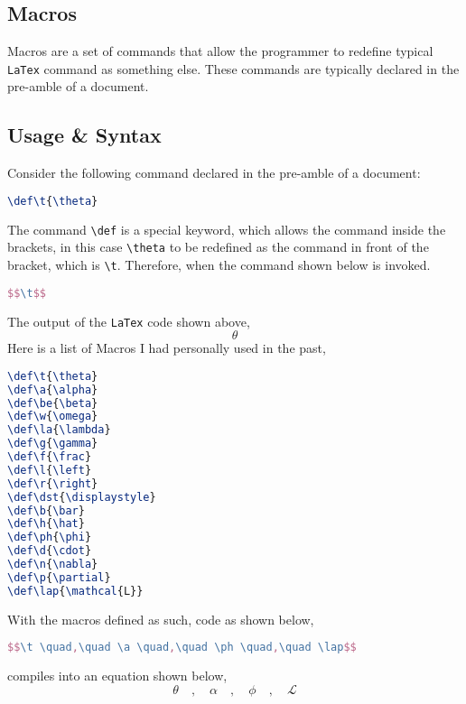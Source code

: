 \documentclass[a4paper, 12pt]{report}
\def\t{\theta}
\def\a{\alpha}
\def\be{\beta}
\def\w{\omega}
\def\la{\lambda}
\def\g{\gamma}
\def\f{\frac}
\def\l{\left}
\def\r{\right}
\def\dst{\displaystyle}
\def\b{\bar}
\def\h{\hat}
\def\ph{\phi}
\def\d{\cdot}
\def\n{\nabla}
\def\p{\partial}
\def\lap{\mathcal{L}}
\begin{document}
\begin{center}
\section{Macros}
\begin{comment}
Macros are evil
\end{comment}
Macros are a set of commands that allow the programmer to redefine typical \texttt{LaTex} command as something else. These commands are typically declared in the pre-amble of a document. 

\subsection{Usage \& Syntax}
\begin{comment}
\end{comment}
Consider the following command declared in the pre-amble of a document:
\begin{lstlisting}[language=tex]
\def\t{\theta}
\end{lstlisting}
The command \texttt{\textbackslash def} is a special keyword, which allows the command inside the brackets, in this case \texttt{\textbackslash theta} to be redefined as the command in front of the bracket, which is \texttt{\textbackslash t}. Therefore, when the command shown below is invoked.
\begin{lstlisting}[language=tex]
$$\t$$
\end{lstlisting}
The output of the \texttt{LaTex} code shown above,
$$\t$$
Here is a list of Macros I had personally used in the past,
\begin{lstlisting}[language=tex]
\def\t{\theta}
\def\a{\alpha}
\def\be{\beta}
\def\w{\omega}
\def\la{\lambda}
\def\g{\gamma}
\def\f{\frac}
\def\l{\left}
\def\r{\right}
\def\dst{\displaystyle}
\def\b{\bar}
\def\h{\hat}
\def\ph{\phi}
\def\d{\cdot}
\def\n{\nabla}
\def\p{\partial}
\def\lap{\mathcal{L}}
\end{lstlisting}
With the macros defined as such, code as shown below,
\begin{lstlisting}[language=tex]
$$\t \quad,\quad \a \quad,\quad \ph \quad,\quad \lap$$
\end{lstlisting}
compiles into an equation shown below,
$$\t \quad,\quad \a \quad,\quad \ph \quad,\quad \lap$$


\end{center}
\end{document}
